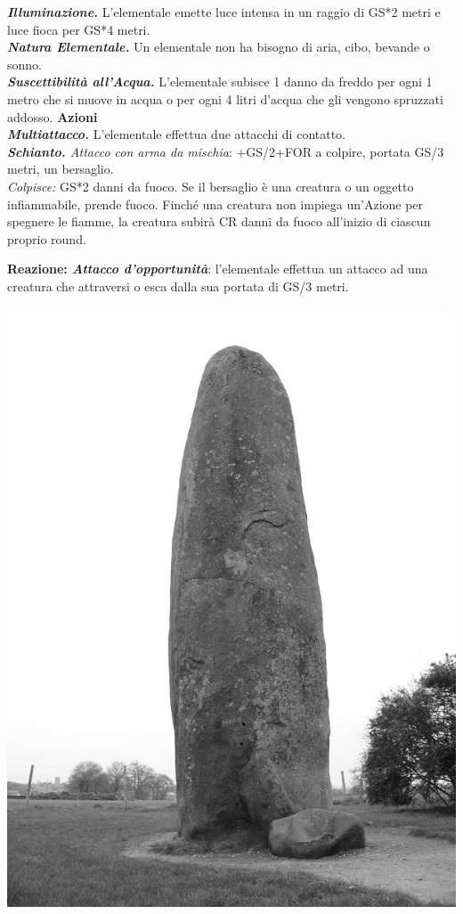 \begin{multicols}{2}
{\emph{\textbf{Illuminazione.}} L'elementale emette luce intensa in un raggio di GS*2 metri e luce fioca per GS*4 metri.\\
\emph{\textbf{Natura Elementale.}} Un elementale non ha bisogno di aria, cibo, bevande o sonno.\\
\emph{\textbf{Suscettibilità all'Acqua.}} L'elementale subisce 1 danno da freddo per ogni 1 metro che si muove in acqua o per ogni 4 litri d'acqua che gli vengono spruzzati addosso.
\textbf{Azioni}\\
\emph{\textbf{Multiattacco.}} L'elementale effettua due attacchi di contatto.\\
\emph{\textbf{Schianto.} Attacco con arma da mischia}: +GS/2+FOR a colpire, portata GS/3 metri, un bersaglio.\\
\emph{Colpisce:} GS*2 danni da fuoco. Se il bersaglio è una creatura o un oggetto infiammabile, prende fuoco. Finché una creatura non impiega un'Azione per spegnere le fiamme, la creatura subirà CR danni da fuoco all'inizio di ciascun proprio round.

\textbf{Reazione: \emph{Attacco d'opportunità}}: l'elementale effettua un attacco ad una creatura che attraversi o esca dalla sua portata di GS/3 metri.


\begin{center}
\includegraphics[width=0.6\linewidth]{immagini/eleterra.png}
\end{center}

}
\end{multicols}

